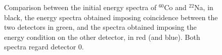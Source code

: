 \begin{figure}[H]
	\begin{minipage}[c]{0.5\linewidth}
	\end{minipage}
	\begin{minipage}[]{0.5\linewidth}
	\centering
	\end{minipage}
	\caption{Comparison between the initial energy spectra of $^{60}$Co and $^{22}$Na, in black, the energy spectra obtained imposing coincidence between the two detectors in green, and the spectra obtained imposing the energy condition on the other detector, in red (and blue). Both spectra regard detector 0.}
    \label{fig:coinc_spectra_all_log}
	\end{figure}

